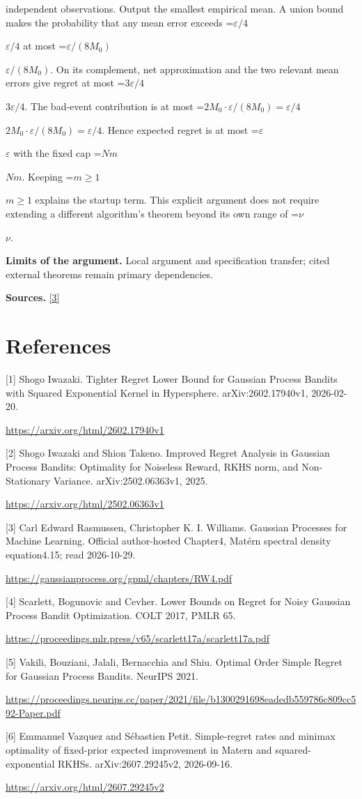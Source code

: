 \documentclass[10pt,a4paper]{article}
\newcommand{\AtlasMath}[1]{\par\begingroup\centering\setbox0=\hbox{$\displaystyle #1$}\ifdim\wd0>1.4\linewidth\typeout{ATLAS WIDE FORMULA: \the\wd0}\fi\ifdim\wd0>\linewidth\resizebox{\linewidth}{!}{\box0}\else\box0\fi\par\endgroup}
\newcommand{\AtlasInlineMath}[1]{\begingroup\setbox0=\hbox{$#1$}\ifdim\wd0>.4\linewidth\endgroup\AtlasMath{#1}\else\endgroup$#1$\fi}
\begin{document}
independent observations. Output the smallest empirical mean. A union bound makes the probability that any mean error exceeds \AtlasInlineMath{\varepsilon/4} at most \AtlasInlineMath{\varepsilon/(8M_0)}. On its complement, net approximation and the two relevant mean errors give regret at most \AtlasInlineMath{3\varepsilon/4}. The bad-event contribution is at most \AtlasInlineMath{2M_0\cdot\varepsilon/(8M_0)=\varepsilon/4}. Hence expected regret is at most \AtlasInlineMath{\varepsilon} with the fixed cap \AtlasInlineMath{Nm}. Keeping \AtlasInlineMath{m\ge1} explains the startup term. This explicit argument does not require extending a different algorithm's theorem beyond its own range of \AtlasInlineMath{\nu}.

\textbf{Limits of the argument.} Local argument and specification transfer; cited external theorems remain primary dependencies.

\textbf{Sources.} \href{https://gaussianprocess.org/gpml/chapters/RW4.pdf}{[3]}

\section{References}
[1] Shogo Iwazaki. Tighter Regret Lower Bound for Gaussian Process Bandits with Squared Exponential Kernel in Hypersphere. arXiv:2602.17940v1, 2026-02-20.

\url{https://arxiv.org/html/2602.17940v1}

[2] Shogo Iwazaki and Shion Takeno. Improved Regret Analysis in Gaussian Process Bandits: Optimality for Noiseless Reward, RKHS norm, and Non-Stationary Variance. arXiv:2502.06363v1, 2025.

\url{https://arxiv.org/html/2502.06363v1}

[3] Carl Edward Rasmussen, Christopher K. I. Williams. Gaussian Processes for Machine Learning. Official author-hosted Chapter4, Matérn spectral density equation4.15; read 2026-10-29.

\url{https://gaussianprocess.org/gpml/chapters/RW4.pdf}

[4] Scarlett, Bogunovic and Cevher. Lower Bounds on Regret for Noisy Gaussian Process Bandit Optimization. COLT 2017, PMLR 65.

\url{https://proceedings.mlr.press/v65/scarlett17a/scarlett17a.pdf}

[5] Vakili, Bouziani, Jalali, Bernacchia and Shiu. Optimal Order Simple Regret for Gaussian Process Bandits. NeurIPS 2021.

\url{https://proceedings.neurips.cc/paper/2021/file/b1300291698eadedb559786c809cc592-Paper.pdf}

[6] Emmanuel Vazquez and Sébastien Petit. Simple-regret rates and minimax optimality of fixed-prior expected improvement in Matern and squared-exponential RKHSs. arXiv:2607.29245v2, 2026-09-16.

\url{https://arxiv.org/html/2607.29245v2}
\end{document}
